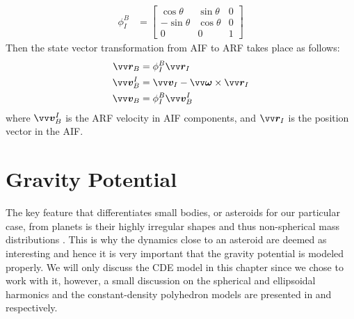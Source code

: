 \begin{align}
    \phi_{I}^{B} &=
    \begin{bmatrix}
        \cos\theta & \sin\theta & 0 \\
        -\sin\theta & \cos\theta & 0 \\
        0 & 0 & 1
    \end{bmatrix}
    \label{eqn:aif_to_arf_transformation matrix}
\end{align}
Then the state vector transformation from \gls{AIF} to \gls{ARF} takes place as follows:
\begin{align}
    \bvector{r}_B &= \phi_I^B \bvector{r}_I
    \label{eqn:aif_to_arf_position} \\
    \bvector{v}_B^I &= \bvector{v}_I - \bvector{\omega} \times \bvector{r}_I
    \label{eqn:aif_to_arf_transport_theorem} \\
    \bvector{v}_B &= \phi_I^B \bvector{v}_B^I
    \label{eqn:aif_to_arf_velocity}
\end{align}
where $\bvector{v}_B^I$ is the \gls{ARF} velocity in \gls{AIF} components, and $\bvector{r}_I$ is the position vector in the \gls{AIF}.

\section{Gravity Potential}
\label{sec:gravity}
The key feature that differentiates small bodies, or asteroids for our particular case, from planets is their highly irregular shapes and thus non-spherical mass distributions \parencite{scheeresBook}. This is why the dynamics close to an asteroid are deemed as interesting and hence it is very important that the gravity potential is modeled properly. We will only discuss the \gls{CDE} model in this chapter since we chose to work with it, however, a small discussion on the spherical and ellipsoidal harmonics and the constant-density polyhedron models are presented in  and  respectively.

